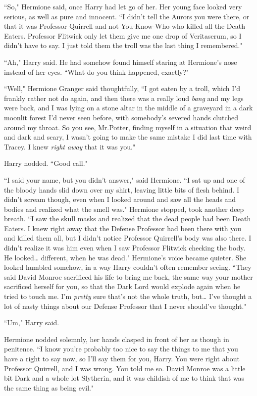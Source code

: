 ``So," Hermione said, once Harry had let go of her. Her young face looked very serious, as well as pure and innocent. ``I didn't tell the Aurors you were there, or that it was Professor Quirrell and not You-Know-Who who killed all the Death Eaters. Professor Flitwick only let them give me one drop of Veritaserum, so I didn't have to say. I just told them the troll was the last thing I remembered."

``Ah," Harry said. He had somehow found himself staring at Hermione's nose instead of her eyes. ``What do you think happened, exactly?"

``Well," Hermione Granger said thoughtfully, ``I got eaten by a troll, which I'd frankly rather not do again, and then there was a really loud \emph{bang} and my legs were back, and I was lying on a stone altar in the middle of a graveyard in a dark moonlit forest I'd never seen before, with somebody's severed hands clutched around my throat. So you see, Mr.\?Potter, finding myself in a situation that weird and dark and scary, I wasn't going to make the same mistake I did last time with Tracey. I knew \emph{right away} that it was you."

Harry nodded. ``Good call."

``I said your name, but you didn't answer," said Hermione. ``I sat up and one of the bloody hands slid down over my shirt, leaving little bits of flesh behind. I didn't scream though, even when I looked around and saw all the heads and bodies and realized what the smell was." Hermione stopped, took another deep breath. ``I saw the skull masks and realized that the dead people had been Death Eaters. I knew right away that the Defense Professor had been there with you and killed them all, but I didn't notice Professor Quirrell's body was also there. I didn't realize it was him even when I saw Professor Flitwick checking the body. He looked{\ldots} different, when he was dead." Hermione's voice became quieter. She looked humbled somehow, in a way Harry couldn't often remember seeing. ``They said David Monroe sacrificed his life to bring me back, the same way your mother sacrificed herself for you, so that the Dark Lord would explode again when he tried to touch me. I'm \emph{pretty} sure that's not the whole truth, but{\ldots} I've thought a lot of nasty things about our Defense Professor that I never should've thought."

``Um," Harry said.

Hermione nodded solemnly, her hands clasped in front of her as though in penitence. ``I know you're probably too nice to say the things to me that you have a right to say now, so I'll say them for you, Harry. You were right about Professor Quirrell, and I was wrong. You told me so. David Monroe was a little bit Dark and a whole lot Slytherin, and it was childish of me to think that was the same thing as being evil."

